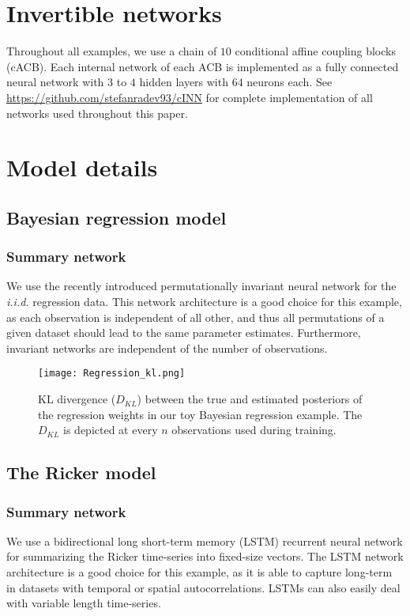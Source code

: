 \documentclass[9pt,twoside,lineno]{pnas-new}
\begin{document}
\section*{Invertible networks}
Throughout all examples, we use a chain of $10$ conditional affine coupling blocks (cACB). Each internal network of each ACB is implemented as a fully connected neural network with $3$ to $4$ hidden layers with $64$ neurons each. See \href{https://github.com/stefanradev93/cINN}{https://github.com/stefanradev93/cINN} for complete implementation of all networks used throughout this paper.

\section*{Model details}

\subsection*{Bayesian regression model}

\subsubsection*{Summary network}
We use the recently introduced permutationally invariant neural network \cite{bloem2019probabilistic} for the \textit{i.i.d.} regression data. This network architecture is a good choice for this example, as each observation is independent of all other, and thus all permutations of a given dataset should lead to the same parameter estimates. Furthermore, invariant networks are independent of the number of observations.

\begin{figure}
\centering
\texttt{[image: Regression\_kl.png]}
\caption{KL divergence ($D_{KL}$) between the true and estimated posteriors of the regression weights in our toy Bayesian regression example. The $D_{KL}$ is depicted at every $n$ observations used during training.} 
\end{figure}

\subsection*{The Ricker model}

\subsubsection*{Summary network}
We use a bidirectional long short-term memory (LSTM) recurrent neural network \cite{gers1999learning} for summarizing the Ricker time-series into fixed-size vectors. The LSTM network architecture is a good choice for this example, as it is able to capture long-term in datasets with temporal or spatial autocorrelations. LSTMs can also easily deal with variable length time-series.
\end{document}
